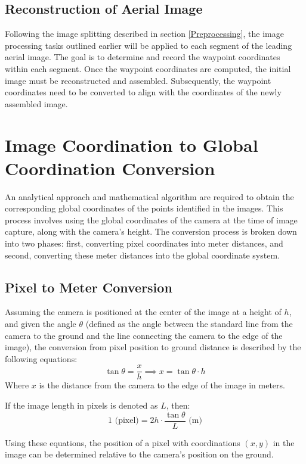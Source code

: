 \documentclass[conference]{IEEEtran}
\begin{document}
\subsection{Reconstruction of Aerial Image}\label{Reconstruction of Aerial Image}
Following the image splitting described in section
\ref{Preprocessing}, the image processing tasks outlined earlier will be applied to each segment of the leading aerial image. The goal is to determine and record the waypoint coordinates within each segment. Once the waypoint coordinates are computed, the initial image must be reconstructed and assembled. Subsequently, the waypoint coordinates need to be converted to align with the coordinates of the newly assembled image.

\section{Image Coordination to Global Coordination Conversion}\label{Image Coordination to Global Coordination Conversion}
An analytical approach and mathematical algorithm are required to obtain the corresponding global coordinates of the points identified in the images. This process involves using the global coordinates of the camera at the time of image capture, along with the camera's height. The conversion process is broken down into two phases: first, converting pixel coordinates into meter distances, and second, converting these meter distances into the global coordinate system.

\subsection{Pixel to Meter Conversion}\label{Pixel to Meter Conversion}
Assuming the camera is positioned at the center of the image at a height of \( h \), and given the angle \( \theta \) (defined as the angle between the standard line from the camera to the ground and the line connecting the camera to the edge of the image), the conversion from pixel position to ground distance is described by the following equations:
\[
\tan \theta = \frac{x}{h} \implies x = \tan \theta  \cdot h
\]
Where \( x \) is the distance from the camera to the edge of the image in meters.

If the image length in pixels is denoted as \( L \), then:
\[
1 \text{ (pixel)} = 2h \cdot \frac{\tan \theta}{L} \text{ (m)}
\]

Using these equations, the position of a pixel with coordinations \((x, y)\) in the image can be determined relative to the camera's position on the ground.
\end{document}
